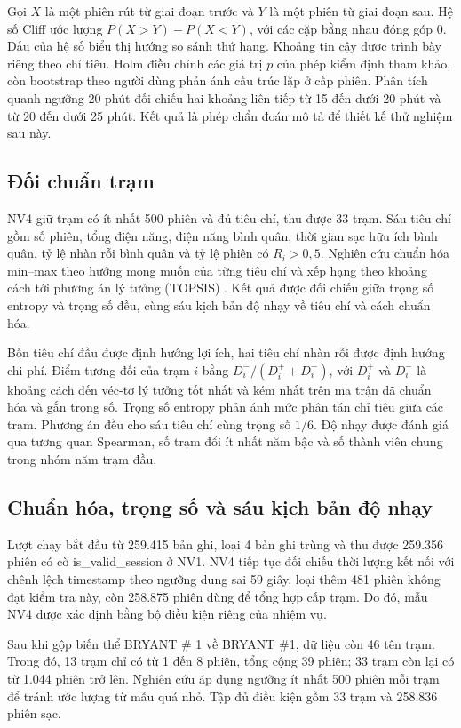\documentclass[conference,a4paper]{IEEEtran}
\begin{document}
Gọi $X$ là một phiên rút từ giai đoạn trước và $Y$ là một phiên từ giai đoạn sau. Hệ số Cliff ước lượng $P(X>Y)-P(X<Y)$, với các cặp bằng nhau đóng góp 0. Dấu của hệ số biểu thị hướng so sánh thứ hạng. Khoảng tin cậy được trình bày riêng theo chỉ tiêu. Holm điều chỉnh các giá trị $p$ của phép kiểm định tham khảo, còn bootstrap theo người dùng phản ánh cấu trúc lặp ở cấp phiên. Phân tích quanh ngưỡng 20 phút đối chiếu hai khoảng liên tiếp từ 15 đến dưới 20 phút và từ 20 đến dưới 25 phút. Kết quả là phép chẩn đoán mô tả để thiết kế thử nghiệm sau này.


\subsection{Đối chuẩn trạm}
NV4 giữ trạm có ít nhất 500 phiên và đủ tiêu chí, thu được 33 trạm. Sáu tiêu chí gồm số phiên, tổng điện năng, điện năng bình quân, thời gian sạc hữu ích bình quân, tỷ lệ nhàn rỗi bình quân và tỷ lệ phiên có $R_i>0{,}5$. Nghiên cứu chuẩn hóa min--max theo hướng mong muốn của từng tiêu chí và xếp hạng theo khoảng cách tới phương án lý tưởng (TOPSIS) \cite{hwang1981}. Kết quả được đối chiếu giữa trọng số entropy và trọng số đều, cùng sáu kịch bản độ nhạy về tiêu chí và cách chuẩn hóa.

Bốn tiêu chí đầu được định hướng lợi ích, hai tiêu chí nhàn rỗi được định hướng chi phí. Điểm tương đối của trạm $i$ bằng $D_i^-/(D_i^++D_i^-)$, với $D_i^+$ và $D_i^-$ là khoảng cách đến véc-tơ lý tưởng tốt nhất và kém nhất trên ma trận đã chuẩn hóa và gắn trọng số. Trọng số entropy phản ánh mức phân tán chỉ tiêu giữa các trạm. Phương án đều cho sáu tiêu chí cùng trọng số $1/6$. Độ nhạy được đánh giá qua tương quan Spearman, số trạm đổi ít nhất năm bậc và số thành viên chung trong nhóm năm trạm đầu.

\subsection{Chuẩn hóa, trọng số và sáu kịch bản độ nhạy}

Lượt chạy bắt đầu từ 259.415 bản ghi, loại 4 bản ghi trùng và thu được 259.356 phiên có cờ is\_valid\_session ở NV1. NV4 tiếp tục đối chiếu thời lượng kết nối với chênh lệch timestamp theo ngưỡng dung sai 59 giây, loại thêm 481 phiên không đạt kiểm tra này, còn 258.875 phiên dùng để tổng hợp cấp trạm. Do đó, mẫu NV4 được xác định bằng bộ điều kiện riêng của nhiệm vụ.

Sau khi gộp biến thể BRYANT \# 1 về BRYANT \#1, dữ liệu còn 46 tên trạm. Trong đó, 13 trạm chỉ có từ 1 đến 8 phiên, tổng cộng 39 phiên; 33 trạm còn lại có từ 1.044 phiên trở lên. Nghiên cứu áp dụng ngưỡng ít nhất 500 phiên mỗi trạm để tránh ước lượng từ mẫu quá nhỏ. Tập đủ điều kiện gồm 33 trạm và 258.836 phiên sạc.
\end{document}
